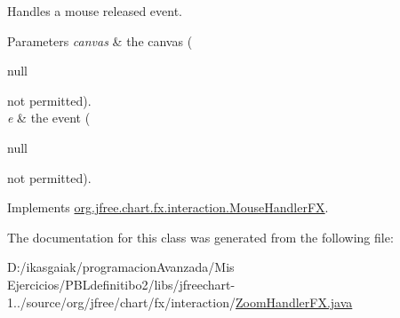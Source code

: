 Handles a mouse released event.


\begin{DoxyParams}{Parameters}
{\em canvas} & the canvas (
\begin{DoxyCode}
null 
\end{DoxyCode}
 not permitted). \\
\hline
{\em e} & the event (
\begin{DoxyCode}
null 
\end{DoxyCode}
 not permitted). \\
\hline
\end{DoxyParams}


Implements \mbox{\hyperlink{interfaceorg_1_1jfree_1_1chart_1_1fx_1_1interaction_1_1_mouse_handler_f_x_adbb7fa38b9913c536fb2a3ae09c70058}{org.\+jfree.\+chart.\+fx.\+interaction.\+Mouse\+Handler\+FX}}.



The documentation for this class was generated from the following file\+:\begin{DoxyCompactItemize}
\item 
D\+:/ikasgaiak/programacion\+Avanzada/\+Mis Ejercicios/\+P\+B\+Ldefinitibo2/libs/jfreechart-\/1../source/org/jfree/chart/fx/interaction/\mbox{\hyperlink{_zoom_handler_f_x_8java}{Zoom\+Handler\+F\+X.\+java}}\end{DoxyCompactItemize}
